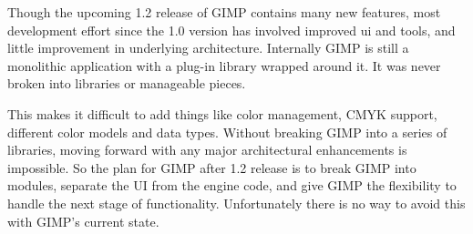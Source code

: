 
Though the upcoming 1.2 release of GIMP contains many new features, most
development effort since the 1.0 version has involved improved ui and tools,
and little improvement in underlying architecture. Internally GIMP is still a
monolithic application with a plug-in library wrapped around it. It was never
broken into libraries or manageable pieces. 

This makes it difficult to add things like color management, CMYK support,
different color models and data types. Without breaking GIMP into a series of
libraries, moving forward with any major architectural enhancements is
impossible. So the plan for GIMP after 1.2 release is to break GIMP into
modules, separate the UI from the engine code, and give GIMP the flexibility to
handle the next stage of functionality. Unfortunately there is no way to avoid
this with GIMP's current state.
